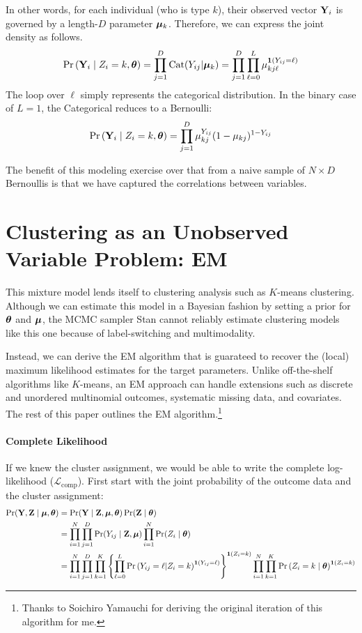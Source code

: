 \documentclass[11pt]{article}
\begin{document}
In other words, for each individual (who is  type \(k\)), their observed vector \(\mathbf{Y}_{i}\) is governed by a length-\(D\) parameter \(\bm{\mu}_{k}\). Therefore, we can express the joint density as follows. 
\begin{align}
\mathbb{\Pr}\left(\mathbf{Y}_{i} \mid Z_{i} = k, \bm{\theta}\right) = \prod^{D}_{j = 1} \text{Cat}(Y_{ij} | \bm{\mu}_k) = \prod^{D}_{j = 1}\prod^{L}_{\ell=0} \mu_{kj\ell}^{\bm{1}\left(Y_{ij} = \ell\right)}
\end{align}
The loop over \(\ell\) simply represents the categorical distribution. In the binary case of \(L = 1\), the Categorical reduces to a Bernoulli:
\begin{align}
\mathbb{\Pr}\left(\mathbf{Y}_{i} \mid Z_{i} = k, \bm{\theta}\right) = \prod^{D}_{j=1}\mu_{kj}^{Y_{ij}}(1 - \mu_{kj})^{1- Y_{ij}}\nonumber
\end{align}

The benefit of this modeling exercise over that from a naive sample of
\(N \times D\) Bernoullis is that we have captured the correlations
between variables.


\section{Clustering as an Unobserved Variable Problem: EM}

This mixture model lends itself to clustering analysis such as \(K\)-means clustering. Although we can estimate this model in a Bayesian fashion by setting a prior for \(\bm{\theta}\) and \(\bm{\mu}\), the MCMC sampler Stan cannot reliably estimate clustering models like this one because of label-switching and multimodality. 

Instead, we can derive the EM algorithm that is guarateed to recover the (local) maximum likelihood estimates for the target parameters. Unlike off-the-shelf algorithms like \(K\)-means, an EM approach can handle extensions such as discrete and unordered multinomial outcomes, systematic missing data, and covariates. The rest of this paper outlines the EM algorithm.\footnote{Thanks to Soichiro Yamauchi for deriving the original iteration of this algorithm for me.}

\paragraph{Complete Likelihood} If we knew the cluster assignment, we would be able to write the complete log-likelihood (\(\mathcal{L}_{\text{comp}}\)). First start with the joint probability of the outcome data and the cluster assignment:
\begin{align}
\Pr(\mathbf{Y}, \mathbf{Z} \mid \bm{\mu}, \bm{\theta}) &= \Pr(\mathbf{Y} \mid \mathbf{Z}, \bm{\mu}, \bm{\theta})\Pr(\mathbf{Z} \mid \bm{\theta})\nonumber\\
&= \prod^{N}_{i=1}\prod^{D}_{j=1}\Pr(Y_{ij} \mid \mathbf{Z}, \bm{\mu}) \prod^N_{i=1}\Pr(Z_i \mid \bm{\theta})\nonumber\\
&= \prod^{N}_{i=1}\prod^{D}_{j=1}\prod^{K}_{k=1}\left\{\prod^{L}_{\ell=0}\mathbb{\Pr}\left(Y_{ij} = \ell | Z_i = k\right)^{\bm{1}\left(Y_{ij} = \ell\right)}\right\}^{\bm{1}\left(Z_i=k\right)} \prod^N_{i=1}\prod^K_{k=1}\mathbb{\Pr}\left(Z_i = {k} \mid \bm{\theta}\right)^{\bm{1}\left(Z_i = k\right)}\nonumber
\end{align}
\end{document}
